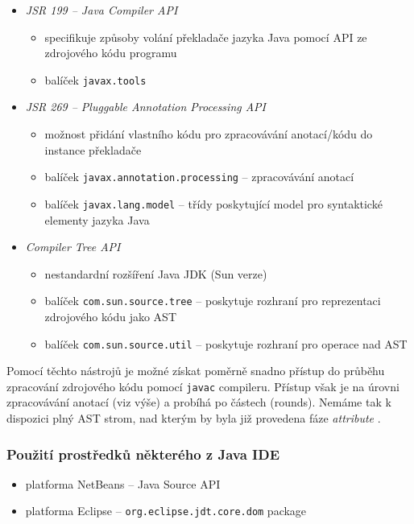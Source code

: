 \begin{itemize}
\item \emph{JSR 199 -- Java Compiler API}
  \begin{itemize}
  \item specifikuje způsoby volání překladače jazyka Java pomocí API ze zdrojového kódu programu
  \item balíček \verb+javax.tools+
  \end{itemize}
\item \emph{JSR 269 -- Pluggable Annotation Processing API}
  \begin{itemize}
  \item možnost přidání vlastního kódu pro zpracovávání anotací/kódu do instance překladače
  \item balíček \verb+javax.annotation.processing+ -- zpracovávání anotací
  \item balíček \verb+javax.lang.model+ -- třídy poskytující model pro syntaktické elementy jazyka Java
  \end{itemize}
\item \emph{Compiler Tree API} \cite{parsertools:compilertreeapi}
  \begin{itemize}
  \item nestandardní rozšíření Java JDK (Sun verze)
  \item balíček \verb+com.sun.source.tree+ -- poskytuje rozhraní pro reprezentaci zdrojového kódu jako AST
  \item balíček \verb+com.sun.source.util+ -- poskytuje rozhraní pro operace nad AST
  \end{itemize}
\end{itemize}

Pomocí těchto nástrojů je možné získat poměrně snadno přístup do průběhu zpracování zdrojového kódu pomocí \verb+javac+ compileru. Přístup však je na úrovni zpracovávání anotací (viz výše) a probíhá po částech (rounds). Nemáme tak k dispozici plný AST strom, nad kterým by byla již provedena fáze \emph{attribute} \cite{hackers_guide_to_javac}.

\subsubsection{Použití prostředků některého z Java IDE}
\begin{itemize}
\item platforma NetBeans \cite{parsertools:javasourcejavadoc} -- Java Source API
\item platforma Eclipse -- \verb+org.eclipse.jdt.core.dom+ package
\end{itemize}
